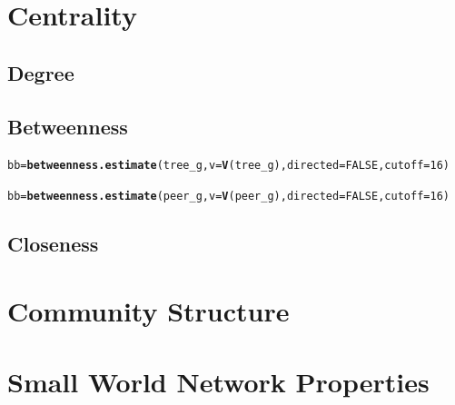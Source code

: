 \documentclass[11pt]{article}\usepackage[]{graphicx}\usepackage[]{color}
\makeatletter
\newcommand{\hlnum}[1]{\textcolor[rgb]{0.686,0.059,0.569}{#1}}%
\newcommand{\hlstd}[1]{\textcolor[rgb]{0.345,0.345,0.345}{#1}}%
\newcommand{\hlkwb}[1]{\textcolor[rgb]{0.69,0.353,0.396}{#1}}%
\newcommand{\hlkwc}[1]{\textcolor[rgb]{0.333,0.667,0.333}{#1}}%
\newcommand{\hlkwd}[1]{\textcolor[rgb]{0.737,0.353,0.396}{\textbf{#1}}}%
\newenvironment{kframe}{%
 \def\at@end@of@kframe{}%
 \ifinner\ifhmode%
  \def\at@end@of@kframe{\end{minipage}}%
  \begin{minipage}{\columnwidth}%
 \fi\fi%
 \def\FrameCommand##1{\hskip\@totalleftmargin \hskip-\fboxsep
 \colorbox{shadecolor}{##1}\hskip-\fboxsep
     \hskip-\linewidth \hskip-\@totalleftmargin \hskip\columnwidth}%
 \MakeFramed {\advance\hsize-\width
   \@totalleftmargin\z@ \linewidth\hsize
   \@setminipage}}%
 {\par\unskip\endMakeFramed%
 \at@end@of@kframe}
\newenvironment{knitrout}{}{} %
\makeatother
\begin{document}
\section{Centrality}

\subsection{Degree}

\subsection{Betweenness}

\begin{knitrout}
\color{fgcolor}\begin{kframe}
\begin{alltt}
\hlstd{bb} \hlkwb{=} \hlkwd{betweenness.estimate}\hlstd{(tree_g,} \hlkwc{v}\hlstd{=}\hlkwd{V}\hlstd{(tree_g),} \hlkwc{directed}\hlstd{=}\hlnum{FALSE}\hlstd{,} \hlkwc{cutoff}\hlstd{=}\hlnum{16}\hlstd{)}
\end{alltt}
\end{kframe}
\end{knitrout}

\begin{knitrout}
\color{fgcolor}\begin{kframe}
\begin{alltt}
\hlstd{bb} \hlkwb{=} \hlkwd{betweenness.estimate}\hlstd{(peer_g,} \hlkwc{v}\hlstd{=}\hlkwd{V}\hlstd{(peer_g),} \hlkwc{directed}\hlstd{=}\hlnum{FALSE}\hlstd{,} \hlkwc{cutoff}\hlstd{=}\hlnum{16}\hlstd{)}
\end{alltt}
\end{kframe}
\end{knitrout}

\subsection{Closeness}

\section{Community Structure}



\section{Small World Network Properties}
\end{document}
